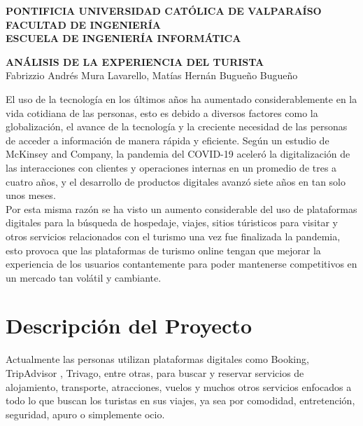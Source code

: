 \documentclass[12pt, letterpaper]{report} %
\begin{document}
    
    \begin{center}
        \textbf{PONTIFICIA UNIVERSIDAD CATÓLICA DE VALPARAÍSO}\\
        \textbf{FACULTAD DE INGENIERÍA}\\
        \textbf{ESCUELA DE INGENIERÍA INFORMÁTICA}

        \vspace{1cm}
        \textbf{ANÁLISIS DE LA EXPERIENCIA DEL TURISTA}\\
        \vspace{1cm}
        Fabrizzio Andrés Mura Lavarello, Matías Hernán Bugueño Bugueño
    \end{center}

    El uso de la tecnología en los últimos años ha aumentado considerablemente en la vida cotidiana de las personas,
    esto es debido a diversos factores como la globalización, el avance de la tecnología y la creciente necesidad de las 
    personas de acceder a información de manera rápida y eficiente. Según un estudio de McKinsey and Company, la pandemia 
    del COVID-19 aceleró la digitalización de las interacciones con clientes y operaciones internas en un promedio de tres a 
    cuatro años, y el desarrollo de productos digitales avanzó siete años en tan solo unos meses\cite{mckinsey2020}.\\

    Por esta misma razón se ha visto un aumento considerable del uso de plataformas digitales para la búsqueda de hospedaje, 
    viajes, sitios túristicos para visitar y otros servicios relacionados con el turismo una vez fue finalizada la pandemia,
    esto provoca que las plataformas de turismo online tengan que mejorar la experiencia de los usuarios contantemente para poder
    mantenerse competitivos en un mercado tan volátil y cambiante.

    \section*{Descripción del Proyecto}
    
    Actualmente las personas utilizan plataformas digitales como Booking\cite{booking2025}, 
    TripAdvisor \cite{tripadvisor2025}, Trivago\cite{trivago2025}, entre otras, para buscar y reservar servicios 
    de alojamiento, transporte, atracciones, vuelos y muchos otros servicios enfocados a todo lo que buscan 
    los turistas en sus viajes, ya sea por comodidad, entretención, seguridad, apuro o simplemente ocio.\\
\end{document}
